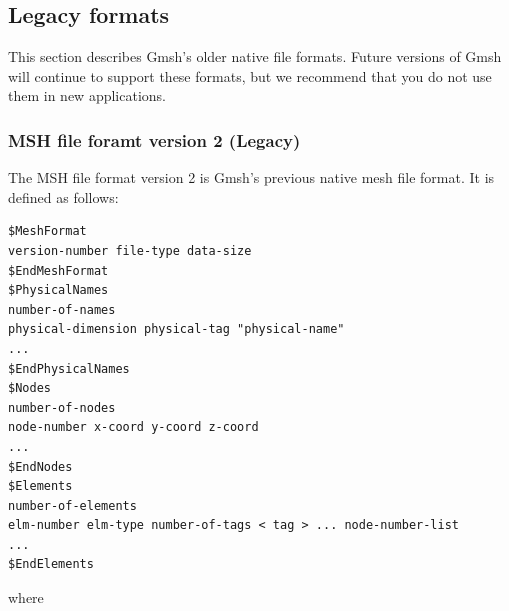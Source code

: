 \documentclass[dvipdfmx, 9pt, a4paper]{article}
\numberwithin{equation}{section}
\begin{document}
\subsection{Legacy formats}
This section describes Gmsh's older native file formats. Future versions of Gmsh will continue to support these formats, but we recommend that you do not use them in new applications.

\subsubsection{MSH file foramt version 2 (Legacy)}
The MSH file format version 2 is Gmsh's previous native mesh file format. It is defined as follows:
\begin{lstlisting}
$MeshFormat
version-number file-type data-size
$EndMeshFormat
$PhysicalNames
number-of-names
physical-dimension physical-tag "physical-name"
...
$EndPhysicalNames
$Nodes
number-of-nodes
node-number x-coord y-coord z-coord
...
$EndNodes
$Elements
number-of-elements
elm-number elm-type number-of-tags < tag > ... node-number-list
...
$EndElements
\end{lstlisting}
where
\end{document}
